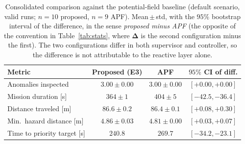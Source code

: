 \begin{table}[t]
\centering
\caption{Consolidated comparison against the potential-field baseline (default
scenario, valid runs; $n=10$ proposed, $n=9$ APF). Mean\,$\pm$\,std, with the $95\%$
bootstrap interval of the difference, in the sense \emph{proposed minus APF}
(the opposite of the convention in Table~\ref{tab:stats}, where $\bm{\Delta}$ is the
second configuration minus the first). The two configurations differ in both
supervisor and controller, so the difference is not attributable to the reactive
layer alone.}
\label{tab:apf}
\footnotesize
\setlength{\tabcolsep}{4pt}
\begin{tabular}{lccc}
\hline
\textbf{Metric} & \textbf{Proposed (E3)} & \textbf{APF} & \textbf{$95\%$ CI of diff.}\\
\hline
Anomalies inspected        & $3.00\pm0.00$ & $3.00\pm0.00$ & $[+0.00,+0.00]$\\
Mission duration [s]       & $364\pm1$     & $404\pm5$     & $[-42.5,-36.4]$\\
Distance traveled [m]     & $86.6\pm0.2$  & $86.4\pm0.1$  & $[+0.08,+0.30]$\\
Min.\ hazard distance [m]  & $4.86\pm0.03$ & $4.81\pm0.00$ & $[+0.03,+0.07]$\\
Time to priority target [s]& $240.8$       & $269.7$       & $[-34.2,-23.1]$\\
\hline
\end{tabular}
\end{table}

